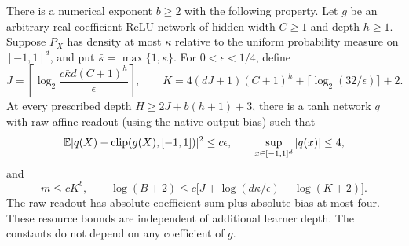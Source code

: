 \begin{lemma}
\label{lem:quantized-raw-compiler}
There is a numerical exponent $b\ge2$ with the following property.  Let
$g$ be an arbitrary-real-coefficient ReLU network of hidden width $C\ge1$
and depth $h\ge1$.  Suppose $P_X$ has density at most $\kappa$ relative to the uniform
probability measure on $[-1,1]^d$, and put $\bar\kappa=\max\{1,\kappa\}$.  For
$0<\epsilon<1/4$, define
\[
 J=\left\lceil\log_2\frac{c\bar\kappa d(C+1)^h}{\epsilon}\right\rceil,
 \qquad
 K=4(dJ+1)(C+1)^h+\lceil\log_2(32/\epsilon)\rceil+2.
\]
At every prescribed depth $H\ge2J+b(h+1)+3$, there is a tanh network $q$
with raw affine readout (using the native output bias) such that
\[
 \mathbb E|q(X)-\operatorname{clip}(g(X),[-1,1])|^2\le c\epsilon,
 \qquad \sup_{x\in[-1,1]^d}|q(x)|\le4,
\]
and
\[
 m\le c K^b,\qquad
 \log(B+2)\le c\big[J+\log(d\bar\kappa/\epsilon)+\log(K+2)\big].
\]
The raw readout has absolute coefficient sum plus absolute bias at most
four.  These resource bounds are independent of additional learner depth.
The constants do not depend on any coefficient of $g$.
\end{lemma}

